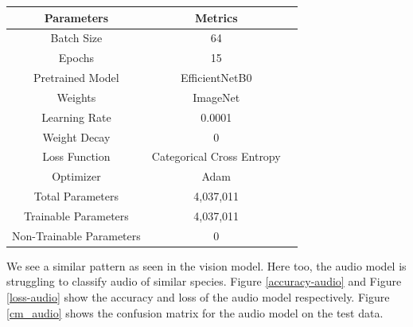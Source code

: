 \documentclass[fleqn, 10pt, twoside]{IOEGC}
\begin{document}
\begin{center}
	\begin{tabular}{ |c|c|c| }
		\hline
		\textbf{Parameters}      & \textbf{Metrics}          \\
		\hline
		Batch Size               & 64                        \\
		\hline
		Epochs                   & 15                        \\
		\hline
		Pretrained Model         & EfficientNetB0            \\
		\hline
		Weights                  & ImageNet                  \\
		\hline
		Learning Rate            & 0.0001                    \\
		\hline
		Weight Decay             & 0                         \\
		\hline
		Loss Function            & Categorical Cross Entropy \\
		\hline
		Optimizer                & Adam                      \\
		\hline
		Total Parameters         & 4,037,011                 \\
		\hline
		Trainable Parameters     & 4,037,011                 \\
		\hline
		Non-Trainable Parameters & 0                         \\
		\hline
	\end{tabular}
	\label{table:audio-model}
\end{center}
We see a similar pattern as seen in the vision model. Here too, the audio model is struggling to classify audio of similar species. Figure \ref{accuracy-audio} and Figure \ref{loss-audio} show the accuracy and loss of the audio model respectively. Figure \ref{cm_audio} shows the confusion matrix for the audio model on the test data.
\end{document}

